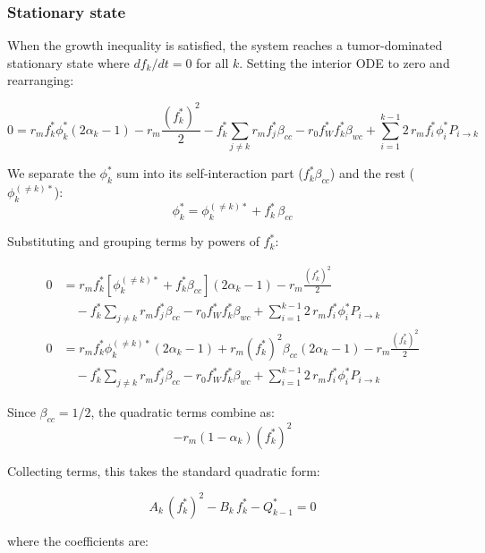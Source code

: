 \documentclass[11pt,a4paper]{article}
\begin{document}
\subsubsection*{Stationary state}

When the growth inequality is satisfied, the system reaches a tumor-dominated stationary state where $df_k/dt = 0$ for all $k$. Setting the interior ODE to zero and rearranging:

\begin{equation}
    0 = r_m f_k^* \phi_k^* (2\alpha_k - 1) - r_m \frac{(f_k^*)^2}{2} - f_k^* \sum_{j \neq k} r_m f_j^* \beta_{cc} - r_0 f_W^* f_k^* \beta_{wc} + \sum_{i=1}^{k-1} 2\, r_m f_i^* \phi_i^* P_{i \to k}
\end{equation}

We separate the $\phi_k^*$ sum into its self-interaction part ($f_k^* \beta_{cc}$) and the rest ($\phi_k^{(\neq k)*}$):
\begin{equation}
    \phi_k^* = \phi_k^{(\neq k)*} + f_k^*\,\beta_{cc}
\end{equation}

Substituting and grouping terms by powers of $f_k^*$:

\begin{align}
    0 &= r_m f_k^* \left[\phi_k^{(\neq k)*} + f_k^* \beta_{cc}\right] (2\alpha_k - 1) - r_m \frac{(f_k^*)^2}{2} \nonumber \\
      &\quad - f_k^* \sum_{j \neq k} r_m f_j^* \beta_{cc} - r_0 f_W^* f_k^* \beta_{wc} + \sum_{i=1}^{k-1} 2\, r_m f_i^* \phi_i^* P_{i \to k} \nonumber \\
    0 &= r_m f_k^* \phi_k^{(\neq k)*} (2\alpha_k - 1) + r_m (f_k^*)^2 \beta_{cc} (2\alpha_k - 1) - r_m \frac{(f_k^*)^2}{2} \nonumber \\
      &\quad - f_k^* \sum_{j \neq k} r_m f_j^* \beta_{cc} - r_0 f_W^* f_k^* \beta_{wc} + \sum_{i=1}^{k-1} 2\, r_m f_i^* \phi_i^* P_{i \to k}
\end{align}

Since $\beta_{cc} = 1/2$, the quadratic terms combine as:
\begin{equation}
    -r_m (1 - \alpha_k) (f_k^*)^2
\end{equation}

Collecting terms, this takes the standard quadratic form:

\begin{equation}
    A_k\,(f_k^*)^2 - B_k\,f_k^* - Q_{k-1}^* = 0
\end{equation}

where the coefficients are:
\end{document}
